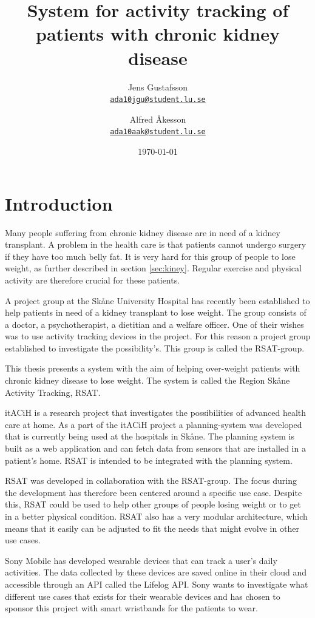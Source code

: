 \documentclass{cslthse-msc}
\author{
	Jens Gustafsson \\
	{\normalsize \href{mailto:ada10jgu@student.lu.se}{\texttt{ada10jgu@student.lu.se}}}
	\and
	Alfred Åkesson \\
    {\normalsize \href{mailto:ada10aak@student.lu.se}{\texttt{ada10aak@student.lu.se}}}
}
\title{System for activity tracking of patients with chronic kidney disease}
\date{\today}
\begin{document}
\makefrontmatter


\chapter[Introduction]{Introduction}

Many people suffering from chronic kidney disease are in need of a kidney transplant. A problem in the health care is that patients cannot undergo surgery if they have too much belly fat. It is very hard for this group of people to lose weight, as further described in section \ref{sec:kiney}. Regular exercise and physical activity are therefore crucial for these patients. 

A project group at the Skåne University Hospital has recently been established to help patients in need of a kidney transplant to lose weight. The group consists of a doctor, a psychotherapist, a dietitian and a welfare officer. One of their wishes was to use activity tracking devices in the project. For this reason a project group established to investigate the possibility's. This group is called the RSAT-group.  

This thesis presents a system with the aim of helping over-weight patients with chronic kidney disease to lose weight. The system is called the Region Skåne Activity Tracking, RSAT. 

itACiH is a research project that investigates the possibilities of advanced health care at home. As a part of the itACiH project a planning-system was developed that is currently being used at the hospitals in Skåne. The planning system is built as a web application and can fetch data from sensors that are installed in a patient's home. RSAT is intended to be integrated with the planning system.

RSAT was developed in collaboration with the RSAT-group. The focus during the development has therefore been centered around a specific use case. Despite this, RSAT could be used to help other groups of people losing weight or to get in a better physical condition. RSAT also has a very modular architecture, which means that it easily can be adjusted to fit the needs that might evolve in other use cases. 

Sony Mobile has developed wearable devices that can track a user’s daily activities. The data collected by these devices are saved online in their cloud and accessible through an API called the Lifelog API. Sony wants to investigate what different use cases that exists for their wearable devices and has chosen to sponsor this project with smart wristbands for the patients to wear.
\end{document}
